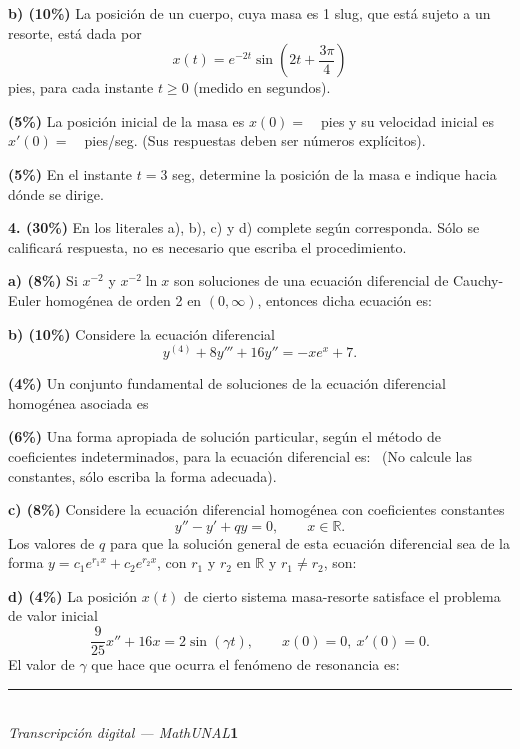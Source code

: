\documentclass[11pt]{article}
\newcommand{\rp}{\underline{\hspace{3cm}}}
\begin{document}
\vspace{0.3cm}
\noindent\textbf{b) (10\%)} La posición de un cuerpo, cuya masa es 1 slug, que está sujeto a un resorte, está dada por
\[
x(t)=e^{-2t}\sin\!\left(2t+\frac{3\pi}{4}\right)
\]
pies, para cada instante $t\geq 0$ (medido en segundos).
\begin{opciones}
\item \textbf{(5\%)} La posición inicial de la masa es $x(0)=$~\rp\ pies y su velocidad inicial es $x'(0)=$~\rp\ pies/seg. (Sus respuestas deben ser números explícitos).
\item \textbf{(5\%)} En el instante $t=3$ seg, determine la posición de la masa e indique hacia dónde se dirige.
\end{opciones}

\newpage

\noindent\textbf{4. (30\%)} En los literales a), b), c) y d) complete según corresponda. Sólo se calificará respuesta, no es necesario que escriba el procedimiento.

\vspace{0.25cm}
\noindent\textbf{a) (8\%)} Si $x^{-2}$ y $x^{-2}\ln x$ son soluciones de una ecuación diferencial de Cauchy-Euler homogénea de orden 2 en $(0,\infty)$, entonces dicha ecuación es: \rp

\vspace{0.3cm}
\noindent\textbf{b) (10\%)} Considere la ecuación diferencial
\[
y^{(4)}+8y'''+16y''=-xe^{x}+7.
\]
\begin{opciones}
\item \textbf{(4\%)} Un conjunto fundamental de soluciones de la ecuación diferencial homogénea asociada es \rp
\item \textbf{(6\%)} Una forma apropiada de solución particular, según el método de coeficientes indeterminados, para la ecuación diferencial es: \rp\ (No calcule las constantes, sólo escriba la forma adecuada).
\end{opciones}

\vspace{0.3cm}
\noindent\textbf{c) (8\%)} Considere la ecuación diferencial homogénea con coeficientes constantes
\[
y''-y'+qy=0, \qquad x\in\mathbb{R}.
\]
Los valores de $q$ para que la solución general de esta ecuación diferencial sea de la forma $y=c_1e^{r_1x}+c_2e^{r_2x}$, con $r_1$ y $r_2$ en $\mathbb{R}$ y $r_1\neq r_2$, son: \rp

\vspace{0.3cm}
\noindent\textbf{d) (4\%)} La posición $x(t)$ de cierto sistema masa-resorte satisface el problema de valor inicial
\[
\frac{9}{25}x''+16x=2\sin(\gamma t), \qquad x(0)=0,\ x'(0)=0.
\]
El valor de $\gamma$ que hace que ocurra el fenómeno de resonancia es: \rp

\vfill
\rule{\linewidth}{0.4pt}\\[1pt]
{\scriptsize\textit{Transcripción digital --- MathUNAL}\hfill\textcolor{unalblue}{\textbf{1}}}
\end{document}

